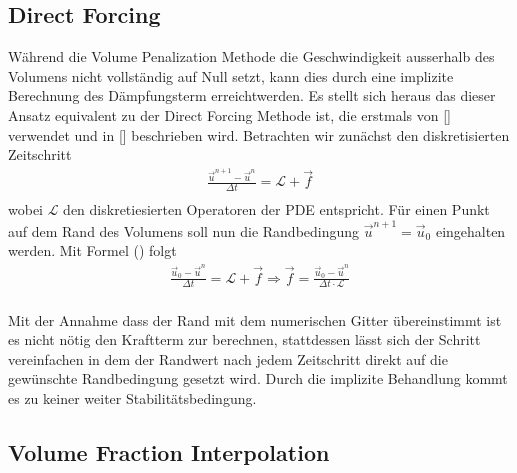 \subsection{Direct Forcing}
Während die Volume Penalization Methode die Geschwindigkeit ausserhalb des Volumens nicht vollständig auf Null setzt,
 kann dies durch eine implizite Berechnung des Dämpfungsterm erreichtwerden. Es stellt sich heraus das dieser Ansatz equivalent
  zu der Direct Forcing Methode ist, die erstmals von [] verwendet und in [] beschrieben wird.
Betrachten wir zunächst den diskretisierten Zeitschritt
\begin{align}
    \frac{\vec{u}^{n+1} -\vec{u}^n}{\Delta t} = \mathscr{L} + \vec{f}\\
\end{align}
wobei $\mathscr{L}$ den diskretiesierten Operatoren der PDE entspricht.
Für einen Punkt auf dem Rand des Volumens soll nun die Randbedingung $\vec{u}^{n+1} = \vec{u}_0$ eingehalten werden.
Mit Formel () folgt
\begin{align}
    \frac{\vec{u}_0 -\vec{u}^n}{\Delta t} = \mathscr{L} + \vec{f} \Rightarrow \vec{f} = \frac{\vec{u}_0 -\vec{u}^n}{\Delta t\cdot \mathscr{L}}\\
\end{align}

Mit der Annahme dass der Rand mit dem numerischen Gitter übereinstimmt ist es nicht nötig den Kraftterm zur berechnen, stattdessen lässt sich der
Schritt vereinfachen in dem der Randwert nach  jedem Zeitschritt direkt auf die gewünschte Randbedingung gesetzt wird. Durch die
implizite Behandlung kommt es zu keiner weiter Stabilitätsbedingung.

\newpage

\subsection{Volume Fraction Interpolation}

